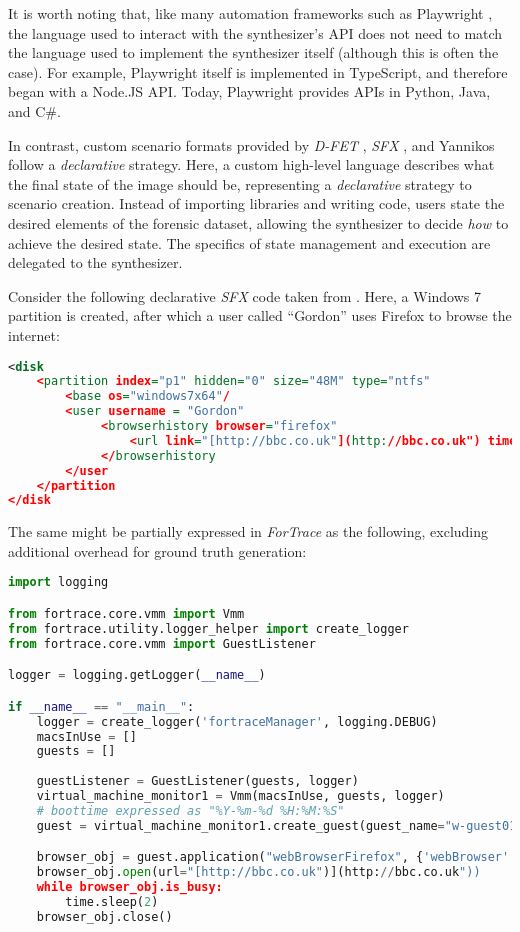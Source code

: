 \documentclass[letterpaper,12pt]{report}
\begin{document}
It is worth noting that, like many automation frameworks such as
Playwright \cite{MicrosoftPlaywrightpython2025}, the language used
to interact with the synthesizer's API does not need to match the
language used to implement the synthesizer itself (although this is
often the case). For example, Playwright itself is implemented in
TypeScript, and therefore began with a Node.JS API. Today, Playwright
provides APIs in Python, Java, and C\#.

In contrast, custom scenario formats provided by \emph{D-FET}
\cite{williamCloudbasedDigitalForensics2011}, \emph{SFX}
\cite{russellForensicImageDescription2012}, and Yannikos
\cite{yannikosDataCorporaDigital2014} follow a \emph{declarative}
strategy. Here, a custom high-level language describes what the final
state of the image should be, representing a \emph{declarative} strategy
to scenario creation. Instead of importing libraries and writing code,
users state the desired elements of the forensic dataset, allowing the
synthesizer to decide \emph{how} to achieve the desired state. The
specifics of state management and execution are delegated to the
synthesizer.

Consider the following declarative \emph{SFX} code taken from
\cite{russellForensicImageDescription2012}. Here, a Windows 7
partition is created, after which a user called ``Gordon'' uses Firefox
to browse the internet:

\begin{lstlisting}[language=XML]
<disk
    <partition index="p1" hidden="0" size="48M" type="ntfs"
        <base os="windows7x64"/
        <user username = "Gordon"
             <browserhistory browser="firefox"
                 <url link="[http://bbc.co.uk"](http://bbc.co.uk") time="13:14:00 1 Jan 2013"/
             </browserhistory
        </user
    </partition
</disk
\end{lstlisting}

The same might be partially expressed in \emph{ForTrace} as the
following, excluding additional overhead for ground truth generation:

\begin{lstlisting}[language=Python]
import logging

from fortrace.core.vmm import Vmm
from fortrace.utility.logger_helper import create_logger
from fortrace.core.vmm import GuestListener

logger = logging.getLogger(__name__)

if __name__ == "__main__":
    logger = create_logger('fortraceManager', logging.DEBUG)
    macsInUse = []
    guests = []
    
    guestListener = GuestListener(guests, logger)
    virtual_machine_monitor1 = Vmm(macsInUse, guests, logger)
    # boottime expressed as "%Y-%m-%d %H:%M:%S"
    guest = virtual_machine_monitor1.create_guest(guest_name="w-guest01", platform="windows", boottime="2013-01-01 13:14:00")

    browser_obj = guest.application("webBrowserFirefox", {'webBrowser': "firefox"})
    browser_obj.open(url="[http://bbc.co.uk")](http://bbc.co.uk"))
    while browser_obj.is_busy:
        time.sleep(2)
    browser_obj.close()
    
\end{lstlisting}
\end{document}
